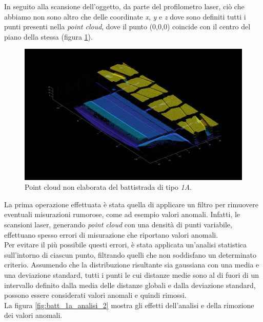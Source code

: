 \noindent In seguito alla scansione dell'oggetto, da parte del profilometro laser, ciò che abbiamo non sono altro che delle coordinate \textit{x}, \textit{y} e \textit{z} dove sono definiti tutti i punti presenti nella \textit{point cloud}, dove il punto (0,0,0) coincide con il centro del piano della stessa (figura \ref{fig:batt_1a_analisi_1}).\\

\begin{figure}[H]
	\centering
	\includegraphics[width=0.8\columnwidth]{./pictures/batt_1a_analisi_1.png}
	\caption{Point cloud non elaborata del battistrada di tipo \textit{1A}.}\label{fig:batt_1a_analisi_1}
\end{figure}

\noindent La prima operazione effettuata è stata quella di applicare un filtro per rimuovere eventuali misurazioni rumorose, come ad esempio valori anomali. Infatti, le scansioni laser, generando \textit{point cloud} con una densità di punti variabile, effettuano spesso errori di misurazione che riportano valori anomali.\\
\newline
Per evitare il più possibile questi errori, è stata applicata un'analisi statistica sull'intorno di ciascun punto, filtrando quelli che non soddisfano un determinato criterio. Assumendo che la distribuzione risultante sia gaussiana con una media e una deviazione standard, tutti i punti le cui distanze medie sono al di fuori di un intervallo definito dalla media delle distanze globali e dalla deviazione standard, possono essere considerati valori anomali e quindi rimossi.\\
\newline
La figura \ref{fig:batt_1a_analisi_2} mostra gli effetti dell'analisi e della rimozione dei valori anomali.

